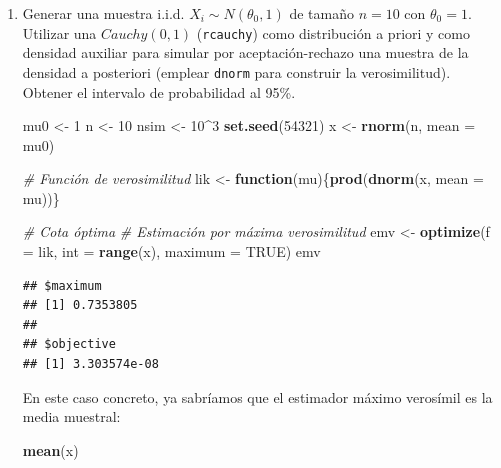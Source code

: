 \documentclass[
]{book}
\newenvironment{Shaded}{\begin{snugshade}}{\end{snugshade}}
\newcommand{\CommentTok}[1]{\textcolor[rgb]{0.56,0.35,0.01}{\textit{#1}}}
\newcommand{\ControlFlowTok}[1]{\textcolor[rgb]{0.13,0.29,0.53}{\textbf{#1}}}
\newcommand{\DataTypeTok}[1]{\textcolor[rgb]{0.13,0.29,0.53}{#1}}
\newcommand{\DecValTok}[1]{\textcolor[rgb]{0.00,0.00,0.81}{#1}}
\newcommand{\KeywordTok}[1]{\textcolor[rgb]{0.13,0.29,0.53}{\textbf{#1}}}
\newcommand{\NormalTok}[1]{#1}
\newcommand{\OperatorTok}[1]{\textcolor[rgb]{0.81,0.36,0.00}{\textbf{#1}}}
\newcommand{\OtherTok}[1]{\textcolor[rgb]{0.56,0.35,0.01}{#1}}
\newcommand{\StringTok}[1]{\textcolor[rgb]{0.31,0.60,0.02}{#1}}
\theoremstyle{break}
\theoremstyle{definition}
\theoremstyle{definition}
\theoremstyle{definition}
\theoremstyle{remark}
\begin{document}
\begin{enumerate}
\def\labelenumi{\alph{enumi})}
\item
  Generar una muestra i.i.d. \(X_{i}\sim N(\theta_{0},1)\) de tamaño
  \(n=10\) con \(\theta_{0}=1\). Utilizar una \(Cauchy(0,1)\)
  (\texttt{rcauchy}) como distribución a priori y como densidad auxiliar
  para simular por aceptación-rechazo una muestra de la densidad a
  posteriori (emplear \texttt{dnorm} para construir la verosimilitud).
  Obtener el intervalo de probabilidad al 95\%.

\begin{Shaded}
\begin{Highlighting}[]
\NormalTok{mu0 <-}\StringTok{ }\DecValTok{1}
\NormalTok{n <-}\StringTok{ }\DecValTok{10}
\NormalTok{nsim <-}\StringTok{ }\DecValTok{10}\OperatorTok{^}\DecValTok{3}
\KeywordTok{set.seed}\NormalTok{(}\DecValTok{54321}\NormalTok{)}
\NormalTok{x <-}\StringTok{ }\KeywordTok{rnorm}\NormalTok{(n, }\DataTypeTok{mean =}\NormalTok{ mu0)}

\CommentTok{# Función de verosimilitud}
\NormalTok{lik <-}\StringTok{ }\ControlFlowTok{function}\NormalTok{(mu)\{}\KeywordTok{prod}\NormalTok{(}\KeywordTok{dnorm}\NormalTok{(x, }\DataTypeTok{mean =}\NormalTok{ mu))\}}

\CommentTok{# Cota óptima}
\CommentTok{# Estimación por máxima verosimilitud}
\NormalTok{emv <-}\StringTok{ }\KeywordTok{optimize}\NormalTok{(}\DataTypeTok{f =}\NormalTok{ lik, }\DataTypeTok{int =} \KeywordTok{range}\NormalTok{(x), }\DataTypeTok{maximum =} \OtherTok{TRUE}\NormalTok{)}
\NormalTok{emv}
\end{Highlighting}
\end{Shaded}

\begin{verbatim}
## $maximum
## [1] 0.7353805
## 
## $objective
## [1] 3.303574e-08
\end{verbatim}

\begin{Shaded}
\end{Shaded}

  En este caso concreto, ya sabríamos que el estimador máximo verosímil es la media muestral:

\begin{Shaded}
\begin{Highlighting}[]
\KeywordTok{mean}\NormalTok{(x)}
\end{Highlighting}
\end{Shaded}


\end{enumerate}
\end{document}
